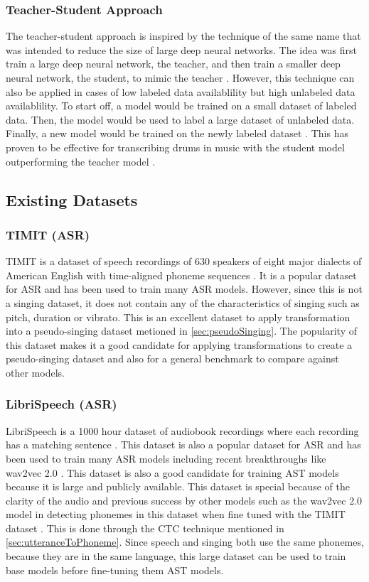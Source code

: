 \documentclass[letterpaper, 12pt]{article}
\begin{document}
\begin{multicols*}{2}
\subsubsection{Teacher-Student Approach} \label{sec:TeacherStudent}
The teacher-student approach is inspired by the technique of the same name that was intended
to reduce the size of large deep neural networks. The idea was first train a large deep neural
network, the teacher, and then train a smaller deep neural network, the student, to mimic the
teacher \citep{TeacherStudent}. However, this technique can also be applied in cases of low labeled
data availablility but high unlabeled data availablility. To start off, a model would be
trained on a small dataset of labeled data. Then, the model would be used to label a large dataset
of unlabeled data. Finally, a new model would be trained on the newly labeled dataset
\citep{DALI}. This has proven to be effective for transcribing drums in music with the student
model outperforming the teacher model \citep{DrumsStudentTeacher}.

\subsection{Existing Datasets}

\subsubsection{TIMIT (ASR)}
TIMIT is a dataset of speech recordings of 630 speakers of eight major dialects of American English
with time-aligned phoneme sequences \citep{TIMIT}. It is a popular dataset for ASR and has been used
to train many ASR models. However, since this is not a singing dataset, it does not contain any of
the characteristics of singing such as pitch, duration or vibrato. This is an excellent dataset to
apply transformation into a pseudo-singing dataset metioned in \ref{sec:pseudoSinging}. The popularity of this dataset
makes it a good candidate for applying transformations to create a pseudo-singing dataset and also
for a general benchmark to compare against other models.

\subsubsection{LibriSpeech (ASR)}
LibriSpeech is a 1000 hour dataset of audiobook recordings where each recording has a matching sentence \citep{Librispeech}. This
dataset is also a popular dataset for ASR and has been used to train many ASR models including
recent breakthroughs like wav2vec 2.0 \citep{wav2vec}. This dataset is also a good candidate for
training AST models because it is large and publicly available. This dataset is special because of
the clarity of the audio and previous success by other models such as the wav2vec 2.0 model in
detecting phonemes in this dataset when fine tuned with the TIMIT dataset \citep{wav2vec}. This is
done through the CTC technique mentioned in \ref{sec:utteranceToPhoneme}. Since
speech and singing both use the same phonemes, because they are in the same language, this large
dataset can be used to train base models before fine-tuning them AST models.


\end{multicols*}
\end{document}
